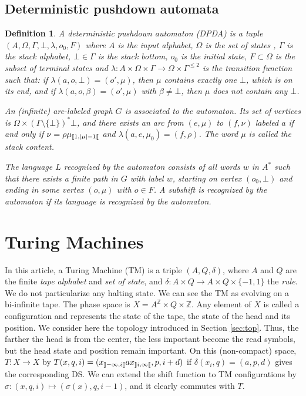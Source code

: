 \documentclass{llncs}
\newtheorem{defi}{Definition}
\newcommand{\az}{A^\Zset}
\newcommand{\Zset}{{\mathbb Z}}
\newcommand{\length}[1]{\left|#1\right|}
\begin{document}
\subsection{Deterministic pushdown automata}
\begin{defi}
A \emph{deterministic pushdown automaton} (DPDA) is a tuple\break $(A,\Omega,\Gamma,\bot,\lambda,o_0,F)$ where $A$ is the \emph{input alphabet}, $\Omega$ is the \emph{set of states }, $\Gamma$ is the \emph{stack alphabet}, $\bot\in\Gamma$ is the \emph{stack bottom}, $o_0$ is the \emph{initial state}, $F\subset\Omega$ is the \emph{subset of terminal states } and $\lambda:A\times\Omega\times\Gamma\to\Omega\times\Gamma^{\le2}$ is the \emph{transition function} such that: if $\lambda(a,o,\bot)=(o',\mu)$, then $\mu$ contains exactly one $\bot$, which is on its end, and if $\lambda(a,o,\beta)=(o',\mu)$ with $\beta\ne\bot$, then $\mu$ does not contain any $\bot$.

An (infinite) arc-labeled graph $G$ is associated to the automaton.
Its set of vertices is $\Omega\times(\Gamma\setminus\{\bot\})^*\bot$, and there exists an arc from $(e,\mu)$ to $(f,\nu)$ labeled $a$ if and only if $\nu=\rho\mu\sco1{\length\mu-1}$ and $\lambda(a,e,\mu_0)=(f,\rho)$. The word $\mu$ is called the \emph{stack content}.

The language $L$ recognized by the automaton consists of all words $w$ in $A^*$ such that there exists a finite path in $G$ with label $w$, starting on vertex $(o_0,\bot)$ and ending in some vertex $(o,\mu)$ with $o\in F$. A subshift is recognized by the automaton if its language is recognized by the automaton.
\end{defi}
\newcommand{\pile}[2][]{(o_{#2},#1\mu^{#2})}
\newcommand{\pilo}[2][]{(o_{#2},#1\mu_0^{#2})}
\section{Turing Machines}
In this article, a Turing Machine (TM) is a triple $(A,Q,\delta)$, where $A$ and $Q$ are the finite \emph{tape alphabet} and \emph{set of state}, and $\delta:A\times Q\to A\times Q\times\{-1,1\}$ the \emph{rule}.
We do not particularize any halting state.
We can see the TM as evolving on a bi-infinite tape.
The phase space is $X=\az\times Q\times\Zset$.
Any element of $X$ is called a configuration and represents the state of the tape, the state of the head and its position.
We consider here the topology introduced in Section \ref{sec:top}.
Thus, the farther the head is from the center, the less important become the read symbols, but the head state and position remain important.
On this (non-compact) space, $T:X\to X$ by $T(x,q,i)=(x_{\left\rrbracket -\infty,i\right\llbracket}ax_{\left\rrbracket i,\infty\right\llbracket},p,i+d)$ if $\delta(x_i,q)=(a,p,d)$ gives the corresponding DS.
We can extend the shift function to TM configurations by $\sigma:(x,q,i)\mapsto(\sigma(x),q,i-1)$, and it clearly commutes with $T$.
\end{document}
